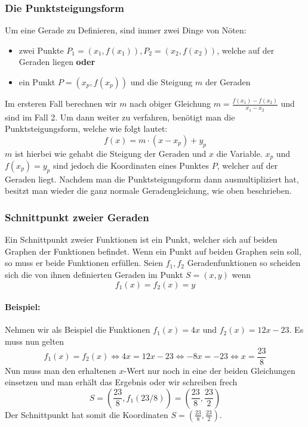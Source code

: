 \subsubsection{Die Punktsteigungsform}
Um eine Gerade zu Definieren, sind immer zwei Dinge von Nöten:
\begin{itemize}
\item zwei Punkte $P_1 = (x_1, f(x_1)), P_2 = (x_2, f(x_2))$, welche auf der Geraden liegen \textbf{oder}
\item ein Punkt $P = (x_p, f(x_p))$ und die Steigung $m$ der Geraden
\end{itemize}
Im ersteren Fall berechnen wir $m$ nach obiger Gleichung $m = \frac{f(x_1) - f(x_2)}{x_1 - x_2}$ und sind im Fall 2. Um dann weiter zu verfahren, benötigt man die Punktsteigungsform, welche wie folgt lautet:
\begin{equation*}
f(x) = m \cdot (x-x_p) + y_p
\end{equation*}
$m$ ist hierbei wie gehabt die Steigung der Geraden und $x$ die Variable. $x_p$ und $f(x_p) = y_p$ sind jedoch die Koordinaten eines Punktes $P$, welcher auf der Geraden liegt. Nachdem man die Punktsteigungsform dann ausmultipliziert hat, besitzt man wieder die ganz normale Geradengleichung, wie oben beschrieben.

\subsubsection{Schnittpunkt zweier Geraden}
Ein Schnittpunkt zweier Funktionen ist ein Punkt, welcher sich auf beiden Graphen der Funktionen befindet. Wenn ein Punkt auf beiden Graphen sein soll, so muss er beide Funktionen erfüllen. Seien $f_1, f_2$ Geradenfunktionen so scheiden sich die von ihnen definierten Geraden im Punkt $S = (x, y)$ wenn
\begin{equation*}
f_1(x) = f_2(x) = y
\end{equation*}

\paragraph{Beispiel:}
Nehmen wir als Beispiel die Funktionen $f_1(x) = 4x$ und $f_2(x) = 12x - 23$. Es muss nun gelten 
\begin{equation*}
	f_1(x) = f_2(x) \iff 4x = 12x - 23 \iff -8x = -23 \iff x = \frac{23}{8}
\end{equation*}
Nun muss man den erhaltenen $x$-Wert nur noch in eine der beiden Gleichungen einsetzen und man erhält das Ergebnis oder wir schreiben frech
\begin{equation*}
S = \left( \frac{23}{8}, f_1(23/8) \right) = \left(\frac{23}{8}, \frac{23}{2} \right)
\end{equation*}
Der Schnittpunkt hat somit die Koordinaten $S = \left(\frac{23}{8}, \frac{23}{2} \right)$.

